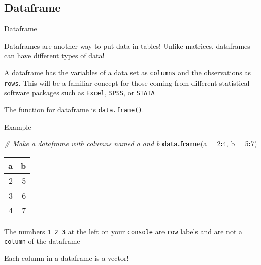 \documentclass[
  ignorenonframetext,
]{beamer}
\newenvironment{Shaded}{\begin{snugshade}}{\end{snugshade}}
\newcommand{\CommentTok}[1]{\textcolor[rgb]{0.56,0.35,0.01}{\textit{#1}}}
\newcommand{\DataTypeTok}[1]{\textcolor[rgb]{0.13,0.29,0.53}{#1}}
\newcommand{\DecValTok}[1]{\textcolor[rgb]{0.00,0.00,0.81}{#1}}
\newcommand{\KeywordTok}[1]{\textcolor[rgb]{0.13,0.29,0.53}{\textbf{#1}}}
\newcommand{\NormalTok}[1]{#1}
\newcommand{\OperatorTok}[1]{\textcolor[rgb]{0.81,0.36,0.00}{\textbf{#1}}}
\begin{document}
\subsection{Dataframe}
\begin{frame}[fragile]{Dataframe}
\protect\hypertarget{dataframe}{}

Dataframes are another way to put data in tables! Unlike matrices,
dataframes can have different types of data!

A dataframe has the variables of a data set as \texttt{columns} and the
observations as \texttt{rows}. This will be a familiar concept for those
coming from different statistical software packages such as
\texttt{Excel}, \texttt{SPSS}, or \texttt{STATA}

The function for dataframe is \texttt{data.frame()}.

\end{frame}

\begin{frame}[fragile]{Example}
\protect\hypertarget{example-7}{}

\begin{Shaded}
\begin{Highlighting}[]
\CommentTok{# Make a dataframe with columns named a and b}
\KeywordTok{data.frame}\NormalTok{(}\DataTypeTok{a =} \DecValTok{2}\OperatorTok{:}\DecValTok{4}\NormalTok{, }\DataTypeTok{b =} \DecValTok{5}\OperatorTok{:}\DecValTok{7}\NormalTok{)}
\end{Highlighting}
\end{Shaded}

\begin{longtable}[]{@{}rr@{}}
\toprule
a & b\tabularnewline
\midrule
\endhead
2 & 5\tabularnewline
3 & 6\tabularnewline
4 & 7\tabularnewline
\bottomrule
\end{longtable}

The numbers \texttt{1\ 2\ 3} at the left on your \texttt{console} are
\texttt{row} labels and are not a \texttt{column} of the dataframe

Each column in a dataframe is a vector!

\end{frame}
\end{document}
